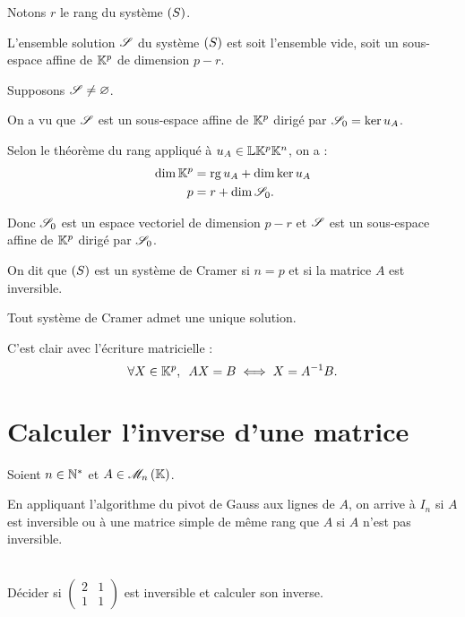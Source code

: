 \begin{prop}
Notons \(r\) le rang du système \(\left(S\right)\).

L'ensemble solution \(\mathscr{S}\) du système \(\left(S\right)\) est soit l'ensemble vide, soit un sous-espace affine de \(\mathbb{K}^p\) de dimension \(p-r\).
\end{prop}

\begin{dem}
Supposons \(\mathscr{S}\not=\varnothing\).

On a vu que \(\mathscr{S}\) est un sous-espace affine de \(\mathbb{K}^p\) dirigé par \(\mathscr{S}_0=\ker u_A\).

Selon le théorème du rang appliqué à \(u_A\in\mathbb{L}{\mathbb{K}^p}{\mathbb{K}^n}\), on a : \[\begin{aligned}
\dim\mathbb{K}^p&=\operatorname{rg} u_A+\dim\ker u_A \\
p&=r+\dim\mathscr{S}_0.
\end{aligned}\]

Donc \(\mathscr{S}_0\) est un espace vectoriel de dimension \(p-r\) et \(\mathscr{S}\) est un sous-espace affine de \(\mathbb{K}^p\) dirigé par \(\mathscr{S}_0\).
\end{dem}

\begin{defi}
On dit que \(\left(S\right)\) est un système de Cramer si \(n=p\) et si la matrice \(A\) est inversible.
\end{defi}

\begin{prop}
Tout système de Cramer admet une unique solution.
\end{prop}

\begin{dem}
C'est clair avec l'écriture matricielle : \[\quantifs{\forall X\in\K^p}AX=B\ssi X=A\inv B.\]
\end{dem}

\section{Calculer l'inverse d'une matrice}

\begin{algo}
Soient \(n\in\mathbb{N}^*\) et \(A\in\M{n}\).

En appliquant l'algorithme du pivot de Gauss aux lignes de \(A\), on arrive à \(I_n\) si \(A\) est inversible ou à une matrice simple de même rang que \(A\) si \(A\) n'est pas inversible.
\end{algo}

\begin{exoex}~\\
Décider si \(\begin{pmatrix}
2 & 1 \\
1 & 1
\end{pmatrix}\) est inversible et calculer son inverse.
\end{exoex}

